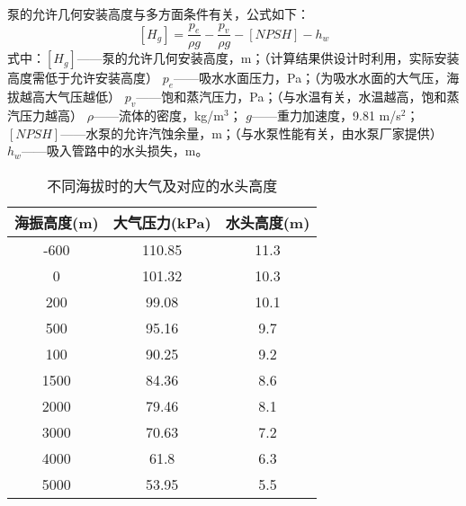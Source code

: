 泵的允许几何安装高度与多方面条件有关\cite{水泵最大安装高度如何计算}，公式如下：
\begin{equation}
	\left[H_g\right]=\dfrac{p_e}{\rho g}-\dfrac{p_v}{\rho g}-\left[NPSH\right]-h_w
\end{equation}
式中：$\left[H_g\right]$——泵的允许几何安装高度，m；（计算结果供设计时利用，实际安装高度需低于允许安装高度）
\newline\phantom{式中：}$p_e$——吸水水面压力，Pa；（为吸水水面的大气压，海拔越高大气压越低）
\newline\phantom{式中：}$p_v$——饱和蒸汽压力，Pa；（与水温有关，水温越高，饱和蒸汽压力越高）
\newline\phantom{式中：}$\rho$——流体的密度，kg/m$^3$；
\newline\phantom{式中：}$g$——重力加速度，9.81 m/s$^2$；
\newline\phantom{式中：}$\left[NPSH\right]$——水泵的允许汽蚀余量，m；（与水泵性能有关，由水泵厂家提供）
\newline\phantom{式中：}$h_w$——吸入管路中的水头损失，m。

\begin{table}[H]
  \centering
  \caption{不同海拔时的大气及对应的水头高度\cite{水泵最大安装高度如何计算}}
    \begin{tabular}{ccc}
    \toprule
    海振高度(m) & 大气压力(kPa) & 水头高度(m) \\
    \midrule
    -600  & 110.85 & 11.3 \\
    0     & 101.32 & 10.3 \\
    200   & 99.08 & 10.1 \\
    500   & 95.16 & 9.7 \\
    100   & 90.25 & 9.2 \\
    1500  & 84.36 & 8.6 \\
    2000  & 79.46 & 8.1 \\
    3000  & 70.63 & 7.2 \\
    4000  & 61.8  & 6.3 \\
    5000  & 53.95 & 5.5 \\
    \bottomrule
    \end{tabular}
	\label{tab:The atmosphere at different altitudes and the corresponding head height}
\end{table}%

